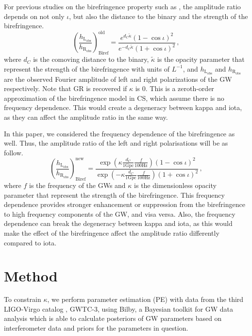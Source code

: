 \documentclass[twocolumn]{aastex631}
\begin{document}
For previous studies on the birefringence property such as \citet{Maria_2021}, the amplitude ratio depends on not only $\iota$,
but also the distance to the binary and the strength of the birefringence.
\begin{equation}
    \left(\frac{h_\mathrm{L_{obs}}}{h_\mathrm{R_{obs}}}\right)_\mathrm{Biref}^\mathrm{old}=\frac{e^{d_C\widetilde{\kappa}}\left(1-\cos\iota\right)^2}{e^{-d_C\widetilde{\kappa}}\left(1+\cos\iota\right)^2}\,,
\end{equation}where $d_C$ is the comoving distance to the binary, $\widetilde{\kappa}$ is the opacity parameter that represent
the strength of the birefringence with units of $L^{-1}$, and $h_\mathrm{L_{obs}}$ and $h_\mathrm{R_{obs}}$ are
the observed Fourier amplitude of left and right polarizations of the GW respectively. Note that GR is recovered if $\kappa$ is $0$.
This is a zeroth-order approximation of the birefringence model in CS, which assume there is no frequency dependence.
This would create a degeneracy between kappa and iota, as they can affect the amplitude ratio in the same way.

In this paper, we considered the frequency dependence of the birefringence as well.
Thus, the amplitude ratio of the left and right polarisations will be as follow.
\begin{equation}
    \left(\frac{h_\mathrm{L_{obs}}}{h_\mathrm{R_{obs}}}\right)_\mathrm{Biref}^\mathrm{new}=\frac{\exp\left({\kappa\frac{d_C}{1\mathrm{ Gpc}}\frac{f}{100\mathrm{ Hz}}}\right)\left(1-\cos\iota\right)^2}{\exp\left({-\kappa\frac{d_C}{1\mathrm{Gpc}}\frac{f}{100\mathrm{Hz}}}\right)\left(1+\cos\iota\right)^2}\,,
\end{equation}where $f$ is the frequency of the GWs and $\kappa$ is the dimensionless opacity parameter that represent the strength of the birefringence.
This frequency dependence provides stronger enhancement or suppression from the birefringence to high frequency components of the GW, and visa versa.
Also, the frequency dependence can break the degeneracy between kappa and iota,
as this would make the effect of the birefringence affect the amplitude ratio differently compared to iota.

\section{Method}

To constrain $\kappa$, we perform parameter estimation (PE) with data from the third LIGO-Virgo catalog \citep{LIGO_2021}, GWTC-3, using Bilby,
a Bayesian toolkit for GW data analysis which is able to calculate posteriors of GW parameters based on interferometer data
and priors for the parameters in question. \citep{Ashton_2019}
\end{document}
